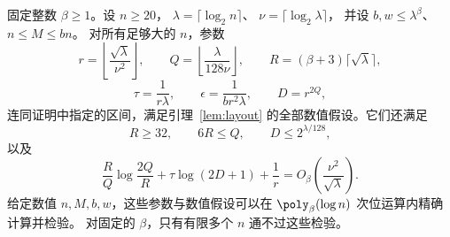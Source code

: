\begin{lemma}\label{lem:incidence-parameters}
固定整数 $\beta\ge1$。设 $n\ge20$，
$\lambda=\lceil\log_2 n\rceil$、
$\nu=\lceil\log_2\lambda\rceil$，
并设 $b,w\le\lambda^\beta$、$n\le M\le bn$。
对所有足够大的 $n$，参数
\begin{equation}\label{eq:parameter-QR}
 r=\left\lfloor\frac{\sqrt\lambda}{\nu^2}\right\rfloor,
 \qquad Q=\left\lfloor\frac{\lambda}{128\nu}\right\rfloor,
 \qquad R=(\beta+3)\lceil\sqrt\lambda\rceil,
\end{equation}
\[
 \tau=\frac1{r\lambda},\qquad
 \epsilon=\frac1{br^2\lambda},\qquad D=r^{2Q},
\]
连同证明中指定的区间，满足引理~\ref{lem:layout}
的全部数值假设。它们还满足
\[
 R\ge32,\qquad 6R\le Q,\qquad D\le2^{\lambda/128},
\]
以及
\begin{equation}\label{eq:balanced-cost}
 \frac RQ\log\frac{2Q}{R}+\tau\log(2D+1)+\frac1r
 =O_\beta\!\left(\frac{\nu^2}{\sqrt\lambda}\right).
\end{equation}
给定数值 $n,M,b,w$，这些参数与数值假设可以在
$\poly_\beta(\log n)$ 次位运算内精确计算并检验。
对固定的 $\beta$，只有有限多个 $n$ 通不过这些检验。
\end{lemma}
